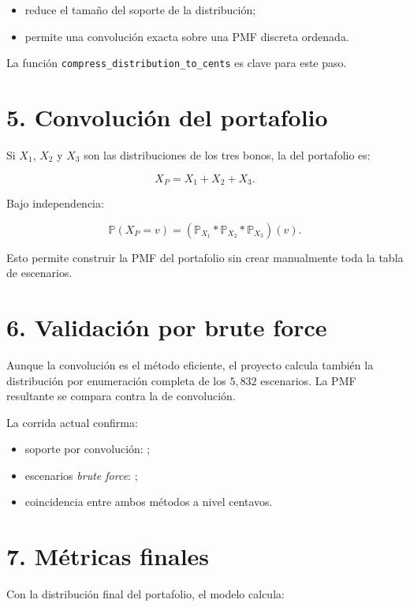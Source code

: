 \begin{itemize}
  \item reduce el tama\~no del soporte de la distribuci\'on;
  \item permite una convoluci\'on exacta sobre una PMF discreta ordenada.
\end{itemize}

La funci\'on \texttt{compress\_distribution\_to\_cents} es clave para este paso.

\section*{5. Convoluci\'on del portafolio}

Si \(X_1\), \(X_2\) y \(X_3\) son las distribuciones de los tres bonos, la del portafolio es:

\[
X_P = X_1 + X_2 + X_3.
\]

Bajo independencia:

\[
\mathbb{P}(X_P=v)=\left(\mathbb{P}_{X_1} * \mathbb{P}_{X_2} * \mathbb{P}_{X_3}\right)(v).
\]

Esto permite construir la PMF del portafolio sin crear manualmente toda la tabla de escenarios.

\section*{6. Validaci\'on por brute force}

Aunque la convoluci\'on es el m\'etodo eficiente, el proyecto calcula tambi\'en la distribuci\'on por enumeraci\'on completa de los \(5{,}832\) escenarios. La PMF resultante se compara contra la de convoluci\'on.

La corrida actual confirma:

\begin{itemize}
  \item soporte por convoluci\'on: \SupportConv;
  \item escenarios \textit{brute force}: \SupportBrute;
  \item coincidencia entre ambos m\'etodos a nivel centavos.
\end{itemize}

\section*{7. M\'etricas finales}

Con la distribuci\'on final del portafolio, el modelo calcula:

